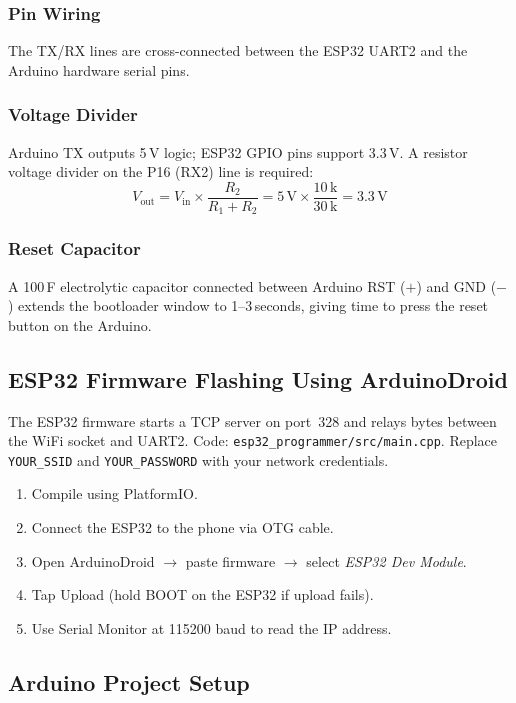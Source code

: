 \documentclass[conference]{IEEEtran}
\begin{document}
\subsubsection{Pin Wiring}
The TX/RX lines are cross-connected between the ESP32 UART2 and the Arduino
hardware serial pins.

\subsubsection{Voltage Divider}
Arduino TX outputs 5\,V logic; ESP32 GPIO pins support 3.3\,V.
A resistor voltage divider on the P16 (RX2) line is required:
\begin{equation}
V_{\text{out}} = V_{\text{in}} \times \frac{R_2}{R_1+R_2}
              = 5\,\text{V} \times \frac{10\,\text{k}}{30\,\text{k}}
              = 3.3\,\text{V}
\end{equation}

\subsubsection{Reset Capacitor}
A 100\,\textmu F electrolytic capacitor connected between Arduino RST ($+$) and
GND ($-$) extends the bootloader window to 1--3\,seconds, giving time to press
the reset button on the Arduino.

\subsection{ESP32 Firmware Flashing Using ArduinoDroid}

The ESP32 firmware starts a TCP server on port~328 and relays bytes between
the WiFi socket and UART2.
Code: \texttt{esp32\_programmer/src/main.cpp}.
Replace \texttt{YOUR\_SSID} and \texttt{YOUR\_PASSWORD} with your network
credentials.

\begin{enumerate}
\item Compile using PlatformIO.
\item Connect the ESP32 to the phone via OTG cable.
\item Open ArduinoDroid $\rightarrow$ paste firmware $\rightarrow$ select
      \textit{ESP32 Dev Module}.
\item Tap Upload (hold BOOT on the ESP32 if upload fails).
\item Use Serial Monitor at 115200 baud to read the IP address.
\end{enumerate}

\subsection{Arduino Project Setup}
\end{document}
